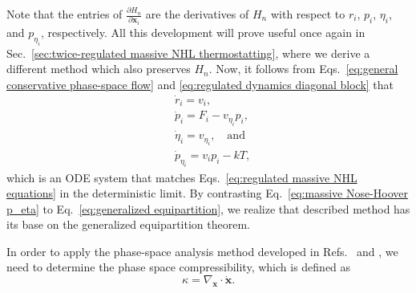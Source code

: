\documentclass[
aip,
jcp,
reprint,
]{revtex4-1}
\newcommand{\vt}[1]{\boldsymbol{\mathbf{#1}}}          %
\newcommand{\diff}[2]{\frac{\partial #2}{\partial #1}} %
\newcommand{\grad}[2]{\diff{#1}{#2}}                   %
\newcommand{\nn}{n}
\begin{document}
Note that the entries of $\grad{\vt x_i}{H_\nn}$ are the derivatives of ${H_\nn}$ with respect to $r_i$, $p_i$, $\eta_i$, and $p_{\eta_i}$, respectively.
All this development will prove useful once again in Sec.~\ref{sec:twice-regulated massive NHL thermostatting}, where we derive a different method which also preserves $H_\nn$.
Now, it follows from Eqs.~\eqref{eq:general conservative phase-space flow} and \eqref{eq:regulated dynamics diagonal block} that
\begin{subequations}
	\label{eq:massive Nose-Hoover equations}
	\begin{align}
	&\dot{r}_i = v_i, \\
	&\dot{p}_i = F_i - v_{\eta_i} p_i, \\
	&\dot{\eta}_i = v_{\eta_i}, \quad \mathrm{and} \\
	&\dot{p}_{\eta_i} = v_i p_i - kT, \label{eq:massive Nose-Hoover p_eta}
	\end{align}
\end{subequations}
which is an ODE system that matches Eqs.~\eqref{eq:regulated massive NHL equations} in the deterministic limit.
By contrasting Eq.~\eqref{eq:massive Nose-Hoover p_eta} to Eq.~\eqref{eq:generalized equipartition}, we realize that described method has its base on the generalized equipartition theorem.

In order to apply the phase-space analysis method developed in Refs.~ and , we need to determine the phase space compressibility, which is defined as
\begin{equation}
\label{eq:phase space compressibility}
\kappa = \nabla_{\vt x} \cdot \dot{\vt x}.
\end{equation}
\end{document}
